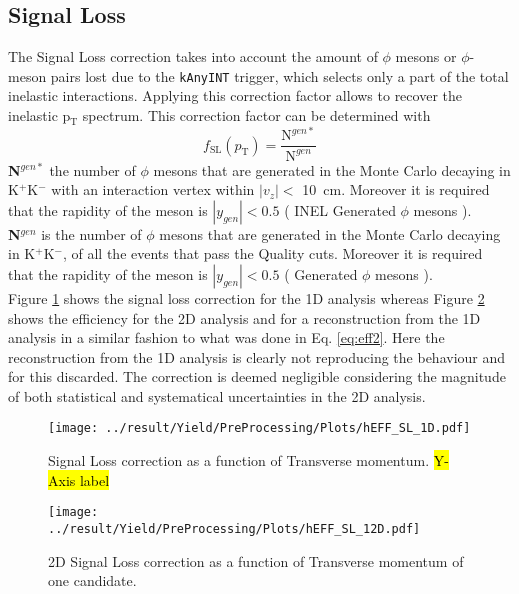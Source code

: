 \subsection{Signal Loss}
The Signal Loss correction takes into account the amount of $\phi$ mesons or $\phi$-meson pairs lost due to the \texttt{kAnyINT} trigger, which selects only a part of the total inelastic interactions. Applying this correction factor allows to recover the inelastic p$_{\text{T}}$ spectrum. This correction factor can be determined with
\begin{equation}
f_{\text{SL}}(p_{\text{T}}) = \frac{\text{N}^{gen*}}{\text{N}^{gen}}
\label{eq:SL}
\end{equation}
\textbf{N$^{gen*}$} the number of $\phi$ mesons that are generated in the Monte Carlo decaying in K$^+$K$^-$ with an interaction vertex within $|v_{z}|<$ \SI{10}{\centi\meter}. Moreover it is required that the rapidity of the meson is $|y_{gen}|<0.5$ ( INEL Generated $\phi$ mesons ).\\
\textbf{N$^{gen}$} is the number of $\phi$ mesons that are generated in the Monte Carlo decaying in K$^+$K$^-$, of all the events that pass the Quality cuts. Moreover it is required that the rapidity of the meson is $|y_{gen}|<0.5$ ( Generated $\phi$ mesons ).\\
Figure \ref{fig:effsl1d} shows the signal loss correction for the 1D analysis whereas Figure \ref{fig:effsl2d} shows the efficiency for the 2D analysis and for a reconstruction from the 1D analysis in a similar fashion to what was done in Eq. \ref{eq:eff2}. Here the reconstruction from the 1D analysis is clearly not reproducing the behaviour and for this discarded. The correction is deemed negligible considering the magnitude of both statistical and systematical uncertainties in the 2D analysis.

\begin{figure}[!h]
\centering
\texttt{[image: ../result/Yield/PreProcessing/Plots/hEFF\_SL\_1D.pdf]}
\caption{Signal Loss correction as a function of Transverse momentum. \hl{Y-Axis label}}
\label{fig:effsl1d}
\end{figure}

\begin{figure}[!h]
\centering
\texttt{[image: ../result/Yield/PreProcessing/Plots/hEFF\_SL\_12D.pdf]}
\caption{2D Signal Loss correction as a function of Transverse momentum of one candidate.}
\label{fig:effsl2d}
\end{figure}

